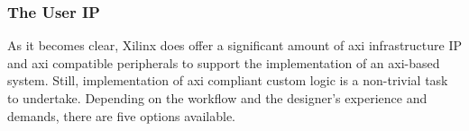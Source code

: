 
\subsubsection{The User IP}

As it becomes clear, Xilinx does offer a significant amount of 
\gls{axi} infrastructure IP and \gls{axi} compatible peripherals
to support the implementation of an \gls{axi}-based system.
Still, implementation of \gls{axi} compliant custom logic is a non-trivial task to undertake.
Depending on the workflow and the designer's experience and demands,
there are five options available.


